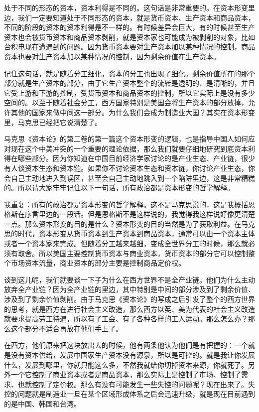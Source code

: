 \documentclass[UTF8, 12pt, a4paper]{ctexrep}
\begin{document}
处于不同的形态的资本，资本利得是不同的。这句话是非常重要的。在资本形变里边，我们一定要知道处于不同形态的资本，就是货币资本、生产资本和商品资本，不同的阶段的资本的资本利得是不一样的。有时候差异会巨大，有的时候甚至生产资本也会被货币资本和商品资本剥削，就是资本家也可能成为被剥削的对象，比如台积电现在遭遇到的问题。因为货币资本要对生产资本加以某种情况的控制，商品资本也要对生产资本加以某种情况的控制，因为剩余价值在生产资本。

记住这句话，就是随着分工细化，资本的分工也出现了细化。剩余价值所在的那个部分就是生产资本的部分，由于它生产资本整个的流转是透明的、是清晰的，并且它受上游和下游的控制，受货币资本和商品资本的控制，所以它实际上是没有多少空间的。以至于随着社会分工，西方国家特别是美国会将生产资本的部分放掉，允许其他的国家来做中间这一部分。为什么我们会成为制造业大国？其实在资本形变里，马克思已经把它说清楚了。

马克思《资本论》的第二卷的第一篇这个资本形变的逻辑，也是指导中国人如何应对现在这个中美冲突的一个重要的理论依据，那么我们就要仔细地研究到底资本利得在哪些部分。因为你知道在中国目前经济学家讨论的是产业生态、产业链，很少有人谈资本生态和资本链。如果你不讨论资本生态和资本链，你讨论产业生态，你会自己主动地进入到误区，甚至会自己主动地跳入到一个陷阱里边，这是非常糟糕的。所以请大家牢牢记住以下一句话，所有政治都是资本形变的哲学解释。

我重复：所有的政治都是资本形变的哲学解释。这不是马克思说的，这是我概括恩格斯在序言里边的一段话。但是恩格斯不是这样说的，我觉得我这样说好像更清楚一点。那么资本形变的目的是什么？资本形变的目的当然是为了获取利益。在马克思的时代，资本形变从货币资本到生产资本到商品资本，通常可以由一个资本主体或者一个资本家来完成。但随着分工越来越细，变成全世界分工的时候，那么就必须有取舍。所以美国主要控制货币资本与商业资本，货币资本的部分它可以控制整个市场资本流量，商业资本的部分主要是控制商品定价权。

谈到这儿呢，我们就要谈一下子为什么在西方世界不是全产业链。他们为什么主动放弃全产业链？因为全产业链的里边，其中特别是中间的部分涉及到了剩余价值、涉及到了剩余价值剥削。由于马克思《资本论》的写成之后引发了整个的西方世界的思考，就是西方在进行社会主义改造，那么西方以英、美为代表的社会主义改造就要求提高劳工待遇，所以有了工会、有了各种各样的工人运动。那么怎么办？那么这个部分不适合再放在他们手上了。

在西方，他们原来把这块放出去的时候，他有两条他认为他们是有把握的：一个就是没有资本供给，发展中国家生产资本没有源泉，所以是可控的。就是我让你发展什么，发展到哪里，你就只能这么多，不然我就给你切掉资本来源，你就死了。另外一个它控制了商业资本或者是商品资本，那么实际上是控制了市场、控制了需求、也就控制了定价权。那么有没有可能发生一些失控的问题呢？现在出来了。失控的问题就是制造业一旦在某个区域形成体系之后会迅速升级，就是现在目前遇到的是中国、韩国和台湾。
\end{document}
